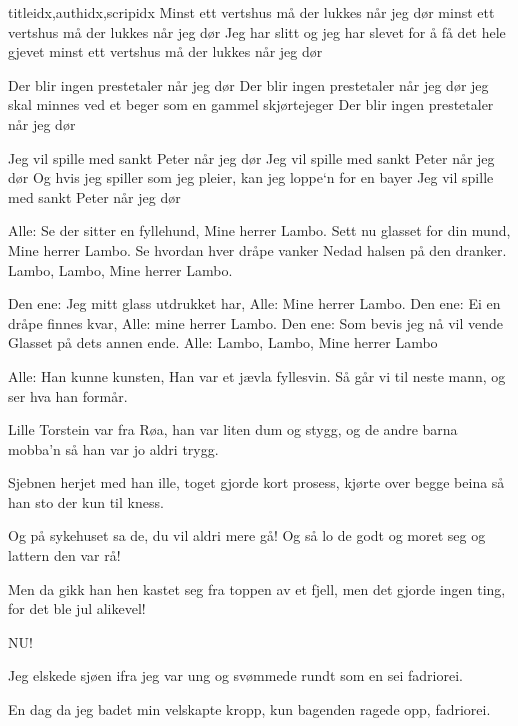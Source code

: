 \documentclass[14pt,letterpaper,norsk]{article}
\begin{document}
\begin{songs}{titleidx,authidx,scripidx}
\beginverse
Minst ett vertshus må der lukkes når jeg dør
minst ett vertshus må der lukkes når jeg dør
Jeg har slitt og jeg har slevet for å få det hele gjevet
minst ett vertshus må der lukkes når jeg dør
\endverse

\beginverse
Der blir ingen prestetaler når jeg dør
Der blir ingen prestetaler når jeg dør
jeg skal minnes ved et beger som en gammel skjørtejeger
Der blir ingen prestetaler når jeg dør
\endverse

\beginverse
Jeg vil spille med sankt Peter når jeg dør
Jeg vil spille med sankt Peter når jeg dør
Og hvis jeg spiller som jeg pleier, kan jeg loppe`n for en bayer
Jeg vil spille med sankt Peter når jeg dør
\endverse
\endsong

\beginverse
Alle: Se der sitter en fyllehund,
Mine herrer Lambo.
Sett nu glasset for din mund,
Mine herrer Lambo.
Se hvordan hver dråpe vanker
Nedad halsen på den dranker.
Lambo, Lambo,
Mine herrer Lambo.
\endverse

\beginverse
Den ene: Jeg mitt glass utdrukket har,
Alle: Mine herrer Lambo.
Den ene: Ei en dråpe finnes kvar,
Alle: mine herrer Lambo.
Den ene: Som bevis jeg nå vil vende
Glasset på dets annen ende.
Alle: Lambo, Lambo,
Mine herrer Lambo
\endverse

\beginverse
Alle: Han kunne kunsten,
Han var et jævla fyllesvin.
Så går vi til neste mann, og
ser hva han formår.
\endverse
\endsong


\beginverse
Lille Torstein var fra Røa,
han var liten dum og stygg,
og de andre barna mobba'n så
han var jo aldri trygg.
\endverse

\beginverse
Sjebnen herjet med han ille,
toget gjorde kort prosess,
kjørte over begge beina
så han sto der kun til kness.
\endverse

\beginverse
Og på sykehuset sa de,
du vil aldri mere gå!
Og så lo de godt og moret seg
og lattern den var rå!
\endverse

\beginverse
Men da gikk han hen kastet seg
fra toppen av et fjell,
men det gjorde ingen ting,
for det ble jul alikevel!
\endverse
\endsong

\beginverse
NU!
\endverse
\endsong

\beginverse
Jeg elskede sjøen ifra jeg var ung
og svømmede rundt som en sei
fadriorei.
\endverse

\beginverse
En dag da jeg badet min velskapte kropp,
kun bagenden ragede opp,
fadriorei.
\endverse


\end{songs}
\end{document}

